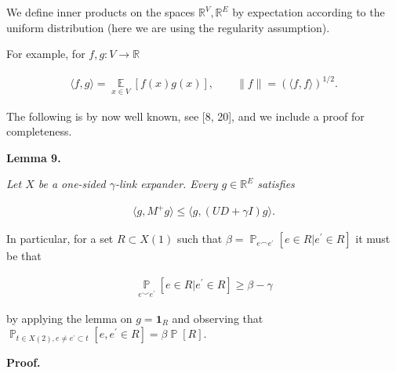 We define inner products on the spaces $\mathbb{R}^{V},\mathbb{R}^{E}$ by expectation according to the uniform distribution (here we are using the regularity assumption).\par




For example, for $f,g:V\to\mathbb{R}$\par


\[\begin{gathered}
\langle f,g\rangle=\operatorname*{\mathbb{E}}_{x\in V}[f(x)g(x)],\qquad\lVert f\rVert=(\langle f,f\rangle)^{1/2}.
\end{gathered}\]


The following is by now well known, see [8, 20], and we include a proof for completeness.\par





\par\medskip\noindent\textbf{
\textbf{Lemma 9}\textbf{.}
}\par



\emph{Let $X$ be a one-sided $\gamma$-link expander. Every $g\in\mathbb{R}^{E}$ satisfies}\par


\[\begin{gathered}
\langle g,M^{+}g\rangle\leq\langle g,(UD+\gamma I)g\rangle.
\end{gathered}\]






In particular, for a set $R\subset X(1)$ such that $\beta=\operatorname*{\mathbb{P}}_{e\smallfrown e^{\prime}}[e\in R|e^{\prime}\in R]$ it must be that\par


\[\begin{gathered}
\operatorname*{\mathbb{P}}_{e\smallsmile e^{\prime}}[e\in R|e^{\prime}\in R]\geq\beta-\gamma
\end{gathered}\]


by applying the lemma on $g={\mathbf{1}}_{R}$ and observing that $\operatorname*{\mathbb{P}}_{t\in X(2),e\neq e^{\prime}\subset t}[e,e^{\prime}\in R]=\beta\operatorname*{\mathbb{P}}[R]$.\par




\par\medskip\noindent\textbf{Proof.}\par




